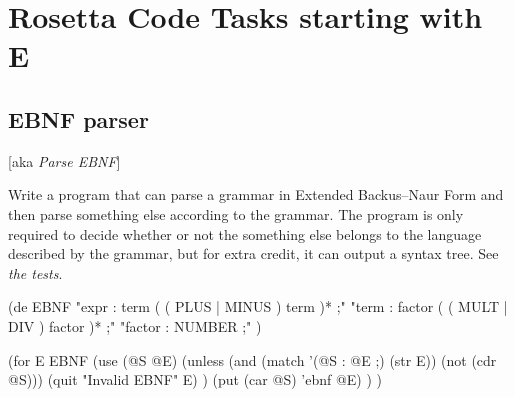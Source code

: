 %
%
%

\chapter{Rosetta Code Tasks starting with E}

\section*{EBNF parser}

[aka \emph{Parse EBNF}]

Write a program that can parse a grammar in Extended Backus--Naur Form
and then parse something else according to the grammar. The program is
only required to decide whether or not the something else belongs to
the language described by the grammar, but for extra credit, it can
output a syntax tree. See \emph{the tests}.


\begin{wideverbatim}

(de EBNF
   "expr  : term ( ( PLUS | MINUS )  term )* ;"
   "term  : factor ( ( MULT | DIV ) factor )* ;"
   "factor   : NUMBER ;" )

(for E EBNF
   (use (@S @E)
      (unless (and (match '(@S : @E ;) (str E)) (not (cdr @S)))
         (quit "Invalid EBNF" E) )
      (put (car @S) 'ebnf @E) ) )


\end{wideverbatim}

